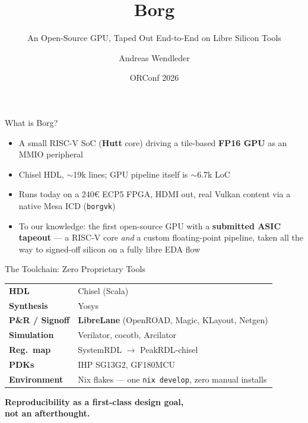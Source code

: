\documentclass[aspectratio=169]{beamer}
\title{Borg}
\subtitle{An Open-Source GPU, Taped Out End-to-End on Libre Silicon Tools}
\author{Andreas Wendleder}
\institute{Independent Researcher \\ \texttt{github.com/gonsolo/Borg}}
\date{ORConf 2026}
\begin{document}
\begin{frame}
  \titlepage
\end{frame}

\begin{frame}{What is Borg?}
  \begin{itemize}[leftmargin=*]
    \item A small RISC-V SoC (\textbf{Hutt} core) driving a tile-based
          \textbf{FP16 GPU} as an MMIO peripheral
    \item Chisel HDL, $\sim$19k lines; GPU pipeline itself is $\sim$6.7k LoC
    \item Runs today on a 240€ ECP5 FPGA, HDMI out, real Vulkan content
          via a native Mesa ICD (\texttt{borgvk})
    \item To our knowledge: the first open-source GPU with a
          \textbf{submitted ASIC tapeout} — a RISC-V core \emph{and} a
          custom floating-point pipeline, taken all the way to signed-off
          silicon on a fully libre EDA flow
  \end{itemize}
\end{frame}

\begin{frame}{The Toolchain: Zero Proprietary Tools}
  \centering
  \begin{tabular}{@{}ll@{}}
    \textbf{HDL}         & Chisel (Scala) \\
    \textbf{Synthesis}   & Yosys \\
    \textbf{P\&R / Signoff} & \textbf{LibreLane} (OpenROAD, Magic, KLayout, Netgen) \\
    \textbf{Simulation}  & Verilator, cocotb, Arcilator \\
    \textbf{Reg.\ map}   & SystemRDL $\to$ PeakRDL-chisel \\
    \textbf{PDKs}        & IHP SG13G2, GF180MCU \\
    \textbf{Environment} & Nix flakes — one \texttt{nix develop}, zero manual installs
  \end{tabular}
  \vfill
  \centering
  \textcolor{borgorange}{\textbf{Reproducibility as a first-class design goal,}}\\
  \textcolor{borgorange}{\textbf{not an afterthought.}}
\end{frame}
\end{document}
